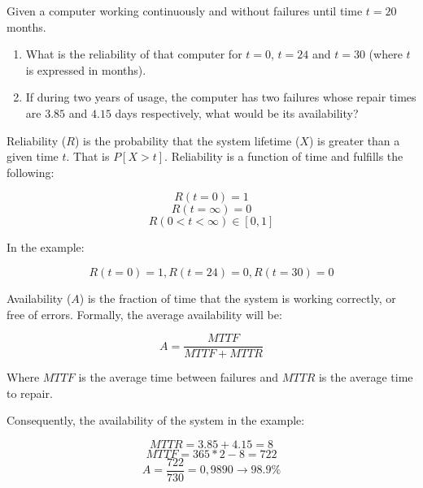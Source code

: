 \begin{acexercise}\end{acexercise}

Given a computer working continuously and without failures until time $t=20$ months.

\begin{enumerate}

\item What is the reliability of that computer for $t=0$, $t=24$ and $t=30$ (where $t$ is expressed in months).

\item If during two years of usage, the computer has two failures whose repair times are $3.85$ and $4.15$ days respectively, what would be its availability?

\end{enumerate}

\begin{acsolution}\end{acsolution}

Reliability ($R$) is the probability that the system lifetime ($X$)
is greater than a given time $t$. That is $P[X>t]$.
Reliability is a function of time and fulfills the following:

\[ R(t=0)=1 \]
\[ R(t=\infty)=0 \]
\[ R(0<t<\infty) \in [0,1] \]

In the example:

\[ R(t=0)=1, R(t=24)=0, R(t=30)=0 \]

Availability ($A$) is the fraction of time that the system is working correctly, or free of errors.
Formally, the average availability will be:

\[
A=\frac{MTTF}{MTTF+MTTR}
\]

Where $MTTF$ is the average time between failures and $MTTR$ is the average time to repair.

Consequently, the availability of the system in the example:

\[ MTTR=3.85+4.15=8 \]
\[ MTTF=365*2-8=722 \]
\[ A=\frac{722}{730}= 0,9890 \rightarrow 98.9\% \]

